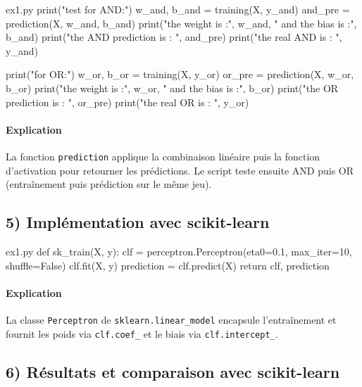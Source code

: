 \documentclass[12pt,a4paper]{article}
\begin{document}
\begin{codeholder}{ex1.py}
print("test for AND:\n")
w_and, b_and = training(X, y_and)
and_pre = prediction(X, w_and, b_and)
print("the weight is :", w_and, " and the bias is :", b_and)
print("the AND prediction is : ", and_pre)
print("the real AND is : ", y_and)

print("\ntest for OR:\n")
w_or, b_or = training(X, y_or)
or_pre = prediction(X, w_or, b_or)
print("the weight is :", w_or, " and the bias is :", b_or)
print("the OR prediction is : ", or_pre)
print("the real OR is : ", y_or)
\end{codeholder}

\paragraph{Explication}
La fonction \texttt{prediction} applique la combinaison linéaire puis
la fonction d'activation pour retourner les prédictions.
Le script teste ensuite AND puis OR (entraînement puis prédiction sur le même jeu).


\subsection*{5) Implémentation avec scikit-learn}

\begin{codeholder}{ex1.py}
def sk_train(X, y):
    clf = perceptron.Perceptron(eta0=0.1, max_iter=10, shuffle=False)
    clf.fit(X, y)
    prediction = clf.predict(X)
    return clf, prediction
\end{codeholder}

\paragraph{Explication}
La classe \texttt{Perceptron} de \texttt{sklearn.linear\_model} encapsule
l'entraînement et fournit les poids via \texttt{clf.coef\_}
et le biais via \texttt{clf.intercept\_}.


\subsection*{6) Résultats et comparaison avec scikit-learn}
\end{document}
